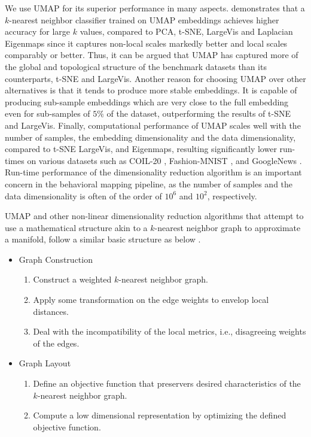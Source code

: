 We use UMAP for its superior performance in many aspects.
\citet{mcinnes_umap_2020} demonstrates that a $k$-nearest neighbor classifier trained on UMAP embeddings achieves higher accuracy for large $k$ values, compared to PCA, t-SNE, LargeVis and Laplacian Eigenmaps since it captures non-local scales markedly better and local scales comparably or better.
Thus, it can be argued that UMAP has captured more of the global and topological structure of the benchmark datasets than its counterparts, t-SNE and LargeVis.
Another reason for choosing UMAP over other alternatives is that it tends to produce more stable embeddings.
It is capable of producing sub-sample embeddings which are very close to the full embedding even for sub-samples of $5\%$ of the dataset, outperforming the results of t-SNE and LargeVis.
Finally, computational performance of UMAP scales well with the number of samples, the embedding dimensionality and the data dimensionality, compared to t-SNE LargeVis, and Eigenmaps, resulting significantly lower run-times on various datasets such as  COIL-20 \citep{nene_columbia_1996}, Fashion-MNIST \citep{xiao_fashion-mnist_2017}, and GoogleNews \citep{mikolov_distributed_2013}.
Run-time performance of the dimensionality reduction algorithm is an important concern in the behavioral mapping pipeline, as the number of samples and the data dimensionality is often of the order of $10^6$ and $10^2$, respectively.

UMAP and other non-linear dimensionality reduction algorithms that attempt to use a mathematical structure akin to a $k$-nearest neighbor graph to approximate a manifold, follow a similar basic structure as below \citep{mcinnes_umap_2020}.
\begin{itemize}
	\item Graph Construction
	      \begin{enumerate}
		      \item Construct a weighted $k$-nearest neighbor graph.
		      \item Apply some transformation on the edge weights to envelop local distances.
		      \item Deal with the incompatibility of the local metrics, i.e., disagreeing weights of the edges.
	      \end{enumerate}
	\item Graph Layout
	      \begin{enumerate}
		      \item Define an objective function that preservers desired characteristics of the $k$-nearest neighbor graph.
		      \item Compute a low dimensional representation by optimizing the defined objective function.
	      \end{enumerate}
\end{itemize}

